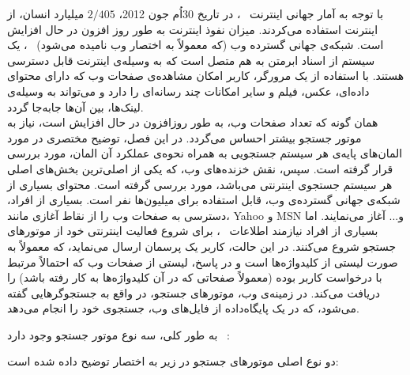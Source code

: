 
با توجه به آمار جهانی اینترنت
~\cite{Intenret-Stat}،
در تاریخ 30اُم جون 2012، $2/405$ میلیارد انسان، از اینترنت استفاده می‌کردند. میزان نفوذ اینترنت به طور روز افزون در حال افزایش است. شبکه‌ی جهانی گسترده وب (که معمولاً به اختصار وب نامیده می‌شود)
~\cite{Web-Crawling}،
یک سیستم از اسناد ابرمتن به هم متصل است که به وسیله‌ی اینترنت قابل دسترسی هستند. با استفاده از یک مرورگر، کاربر امکان مشاهده‌ی صفحات وب که دارای محتوای داده‌ای، عکس، فیلم و سایر امکانات چند رسانه‌ای را دارد و می‌تواند به وسیله‌ی لینک‌ها، بین آن‌ها جابه‌جا گردد.
\\
همان گونه که تعداد صفحات وب، به طور روزافزون در حال افزایش است، نیاز به موتور جستجو بیشتر احساس می‌گردد. در این فصل، توضیح مختصری در مورد المان‌های پایه‌ی هر سیستم جستجویی به همراه نحوه‌ی عملکرد آن المان، مورد بررسی قرار گرفته است. سپس، نقش خزنده‌های وب، که یکی از اصلی‌ترین بخش‌های اصلی هر سیستم جستجوی اینترنتی می‌باشد، مورد بررسی گرفته است.
محتوای بسیاری از شبکه‌ی جهانی گسترده‌ی وب، قابل استفاده برای میلیون‌ها نفر است. بسیاری از افراد، دسترسی به صفحات وب را از نقاط آغازی مانند، Yahoo و MSN و... آغاز می‌نمایند. اما بسیاری از افراد نیازمند اطلاعات
~\cite{User-Action}،
برای شروع فعالیت اینترنتی خود از موتورهای جستجو شروع می‌کنند. در این حالت، کاربر یک پرسمان ارسال می‌نماید، که معمولاً به صورت لیستی از کلیدواژه‌ها است و در پاسخ، لیستی از صفحات وب که احتمالاً مرتبط با درخواست کاربر بوده (معمولاً صفحاتی که در آن کلیدواژه‌ها  به کار رفته باشد) را دریافت می‌کند. در زمینه‌ی وب، موتورهای جستجو، در واقع به جستجوگرهایی گفته می‌شود، که در یک پایگاه‌داده‌ از فایل‌های وب، جستجوی خود را انجام می‌دهد.

به طور کلی، سه نوع موتور جستجو وجود دارد
~\cite{Web-Crawling}:





دو نوع اصلی موتورهای جستجو در زیر به اختصار توضیح داده شده است:

